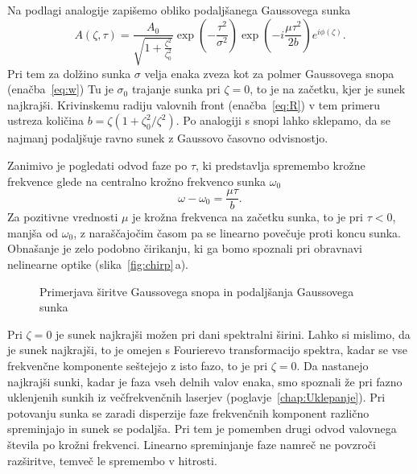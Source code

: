 Na podlagi analogije zapišemo obliko podaljšanega Gaussovega sunka
\begin{equation}
A\left(\zeta,\tau\right)=\frac{A_{0}}{\sqrt{1+\frac{\zeta^{2}
}{\zeta_{0}^{2}}}}\exp\left(-\frac{\tau^{2}}{\sigma^{2}}\right)\exp
\left(-i\frac{\mu\tau^{2}}{2b}\right)e^{i\phi\left(\zeta\right)}.
\label{9.72}
\end{equation}
Pri tem za dolžino sunka $\sigma$ velja enaka zveza kot za polmer 
Gaussovega snopa (enačba~\ref{eq:w})
Tu je $\sigma_{0}$ trajanje sunka pri $\zeta=0$, to je na začetku,
kjer je sunek najkrajši. Krivinskemu radiju valovnih front (enačba~\ref{eq:R}) v tem primeru
ustreza količina $b=\zeta\left(1+\zeta_{0}^{2}/\zeta^{2}\right)$.
Po analogiji s snopi lahko sklepamo, da se najmanj 
podaljšuje ravno sunek z Gaussovo časovno odvisnostjo. 

Zanimivo je pogledati odvod faze po $\tau$, ki predstavlja spremembo krožne
frekvence glede na centralno krožno frekvenco sunka $\omega_{0}$
\begin{equation}
\omega-\omega_{0}=\frac{\mu\tau}{b}.
\label{9.74}
\end{equation}
Za pozitivne vrednosti $\mu$ je krožna frekvenca na začetku sunka,
to je pri $\tau<0$, manjša od $\omega_0$, z naraščajočim časom pa se 
linearno povečuje proti koncu sunka. Obnašanje je zelo podobno čirikanju, 
ki ga bomo spoznali pri obravnavi nelinearne optike (slika~\ref{fig:chirp}\,a). 

\begin{figure}[h]
\centering
\def\svgwidth{120truemm} 

\caption{Primerjava širitve Gaussovega snopa in podaljšanja Gaussovega sunka}
\label{fig:Gausstau}
\end{figure}
\begin{remark}
Pri $\zeta=0$ je sunek najkrajši možen pri dani spektralni
širini. Lahko si mislimo, da je sunek najkrajši,
to je omejen s Fourierevo transformacijo spektra, kadar se
vse frekvenčne komponente seštejejo z isto fazo, to je pri $\zeta=0$.
Da nastanejo najkrajši sunki, kadar je faza vseh delnih valov enaka,
smo spoznali že pri fazno uklenjenih sunkih iz večfrekvenčnih laserjev
(poglavje~\ref{chap:Uklepanje}).
Pri potovanju sunka se zaradi disperzije faze frekvenčnih komponent
različno spreminjajo in sunek se podaljša. Pri tem je pomemben  
drugi odvod valovnega števila po krožni frekvenci. Linearno spreminjanje faze 
namreč ne povzroči razširitve, temveč le spremembo v hitrosti.
\end{remark}

